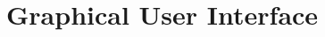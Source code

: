 \documentclass[11pt,fleqn]{book} %
\begin{document}
\chapter{Graphical User Interface}



\end{document}
